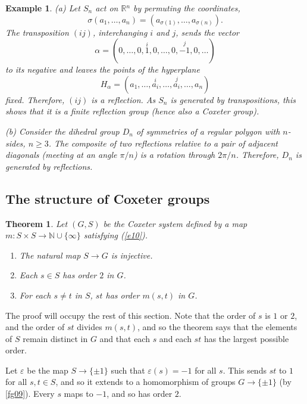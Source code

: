 \documentclass[a4paper,11pt,final]{memoir}%
\newtheorem{theorem}[X]{Theorem}
\newtheorem{example}[X]{Example}
\theoremstyle{nonumberplain}
\begin{document}
\begin{example}
\label{fg15}(a) Let $S_{n}$ act on $\mathbb{R}{}^{n}$ by permuting the
coordinates,%
\[
\sigma(a_{1},\ldots,a_{n})=(a_{\sigma(1)},\ldots,a_{\sigma(n)}).
\]
The transposition $(ij)$, interchanging $i$ and $j$, sends the vector%
\[
\alpha=(0,\ldots,0,\overset{i}{1},0,\ldots,0,\overset{j}{-1},0,\ldots)
\]
to its negative and leaves the points of the hyperplane%
\[
H_{\alpha}=(a_{1},\ldots,\overset{i}{a_{i}},\ldots,\overset{j}{a_{i}}%
,\ldots,a_{n})
\]
fixed. Therefore, $(ij)$ is a reflection. As $S_{n}$ is generated by
transpositions, this shows that it is a finite reflection group (hence also a
Coxeter group).

(b) Consider the dihedral group $D_{n}$ of symmetries of a regular polygon
with $n$-sides, $n\geq3$. The composite of two reflections relative to a pair
of adjacent diagonals (meeting at an angle $\pi/n$) is a rotation through
$2\pi/n$. Therefore, $D_{n}$ is generated by reflections.
\end{example}

\subsection{The structure of Coxeter groups}

\begin{theorem}
\label{fg16}%
%
Let $(G,S)$ be the Coxeter system defined by a map $m\colon S\times
S\rightarrow\mathbb{N}{}\cup\{\infty\}$ satisfying (\ref{e10}).

\begin{enumerate}
\item The natural map $S\rightarrow G$ is injective.

\item Each $s\in S$ has order $2$ in $G$.

\item For each $s\neq t$ in $S$, $st$ has order $m(s,t)$ in $G$.
\end{enumerate}
\end{theorem}

The proof will occupy the rest of this section. Note that the order of $s$ is
$1$ or $2$, and the order of $st$ divides $m(s,t)$, and so the theorem says
that the elements of $S$ remain distinct in $G$ and that each $s$ and each
$st$ has the largest possible order.

Let $\varepsilon$ be the map $S\rightarrow\{\pm1\}$ such that $\varepsilon
(s)=-1$ for all $s$. This sends $st$ to $1$ for all $s,t\in S$, and so it
extends to a homomorphism of groups $G\rightarrow\{\pm1\}$ (by \ref{fg09}).
Every $s$ maps to $-1$, and so has order $2$.
\end{document}
